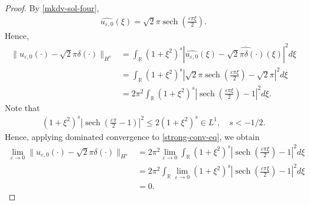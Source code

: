 \documentclass[12pt,reqno]{amsart}
\numberwithin{equation}{section}  %
\newcommand{\rr}{\mathbb{R}}
\newcommand{\wh}{\widehat}
\newcommand{\ee}{\varepsilon}
\DeclareMathOperator{\sech}{sech}
\begin{document}
          \begin{proof}
            By \eqref{mkdv-sol-four},
            \begin{equation*}
            \begin{split}
              \wh{u_{\ee, 0}}(\xi) = \sqrt{2} \pi \sech\left( \frac{\ee \pi
              \xi}{2} \right).
            \end{split}
            \end{equation*}
            Hence,
            \begin{equation}
              \label{strong-conv-eq}
            \begin{split}
              \| u_{\ee, 0}(\cdot) -
              \sqrt{2} \pi \delta(\cdot) \|_{H^{s}}
              & = \int_{\rr} (1 + \xi^{2})^{s} | \wh{u_{\ee, 0}}(\xi) -
              \wh{\sqrt{2} \pi \delta(\cdot)}(\xi) |^{2} d \xi
              \\
              & = \int_{\rr} (1 + \xi^{2})^{s} | \sqrt{2} \pi \sech\left(
              \frac{\ee \pi \xi}{2}
              \right) - \sqrt{2} \pi |^{2} d \xi
              \\
              & = 2 \pi^{2} \int_{\rr} (1 + \xi^{2})^{s} |\sech\left( \frac{\ee \pi
              \xi}{2}
              \right) -1  |^{2} d \xi.
            \end{split}
            \end{equation}
            Note that
            \begin{equation*}
            \begin{split}
              (1 + \xi^{2})^{s} |\sech\left( \frac{\ee \pi}{2} -1 \right )
              |^{2}
              \le 2(1 + \xi^{2})^{s} \in L^{1}, \quad s<-1/2.
            \end{split}
            \end{equation*}
            Hence, applying dominated convergence to \eqref{strong-conv-eq}, we
            obtain
            \begin{equation*}
            \begin{split}
              \lim_{\ee \to 0}
              \| u_{\ee, 0}(\cdot) -
              \sqrt{2} \pi \delta(\cdot) \|_{H^{s}}
              & = 2 \pi^{2} \lim_{\ee \to 0}
              \int_{\rr} (1 + \xi^{2})^{s} |\sech\left( \frac{\ee \pi
              \xi}{2}
              \right) -1  |^{2} d \xi
              \\
              & = 2 \pi^{2}  
              \int_{\rr} \lim_{\ee \to 0}
              (1 + \xi^{2})^{s} |\sech\left( \frac{\ee \pi \xi}{2}
              \right) -1  |^{2} d \xi
              \\
              & = 0. 
            \end{split}
            \end{equation*}
          \end{proof}
\end{document}
